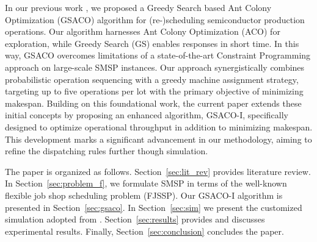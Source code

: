 In our previous work \cite{Ali2024}, we proposed a Greedy Search based Ant Colony Optimization (GSACO)
algorithm for (re-)scheduling semiconductor production operations. 
Our algorithm harnesses Ant Colony Optimization (ACO) \cite{Dorigo2019} for exploration, while
Greedy Search (GS) \cite{Papadimitriou} enables responses in short time. 
In this way, GSACO overcomes limitations of a state-of-the-art Constraint Programming approach \cite{Perron2023}
on large-scale SMSP instances. Our approach synergistically combines probabilistic operation sequencing with a greedy machine assignment strategy, targeting up to five operations per lot with the primary objective of minimizing makespan. Building on this foundational work, the current paper extends these initial concepts by proposing an enhanced algorithm, GSACO-I, specifically designed to optimize operational throughput in addition to minimizing makespan. This development marks a significant advancement in our methodology, aiming to refine the dispatching rules further though simulation.

The paper is organized as follows. 
Section~\ref{sec:lit_rev} provides literature review.
In Section~\ref{sec:problem_f}, we formulate SMSP in terms of the well-known flexible job shop scheduling problem (FJSSP). 
Our GSACO-I algorithm is presented in Section~\ref{sec:gsaco}.
In Section~\ref{sec:sim} we present the customized simulation adopted from \cite{Kovacs2022}.
Section~\ref{sec:results} provides and discusses experimental results.
Finally, Section~\ref{sec:conclusion} concludes the paper.





